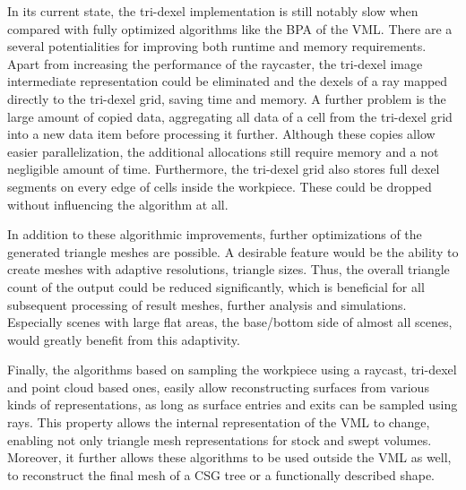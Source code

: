 In its current state, the tri-dexel implementation is still notably slow when compared with fully optimized algorithms like the BPA of the VML.
There are a several potentialities for improving both runtime and memory requirements.
Apart from increasing the performance of the raycaster, the tri-dexel image intermediate representation could be eliminated and the dexels of a ray mapped directly to the tri-dexel grid, saving time and memory.
A further problem is the large amount of copied data, \eg aggregating all data of a cell from the tri-dexel grid into a new data item before processing it further.
Although these copies allow easier parallelization, the additional allocations still require memory and a not negligible amount of time.
Furthermore, the tri-dexel grid also stores full dexel segments on every edge of cells inside the workpiece.
These could be dropped without influencing the algorithm at all.

In addition to these algorithmic improvements, further optimizations of the generated triangle meshes are possible.
A desirable feature would be the ability to create meshes with adaptive resolutions, \ie triangle sizes.
Thus, the overall triangle count of the output could be reduced significantly, which is beneficial for all subsequent processing of result meshes, \eg further analysis and simulations.
Especially scenes with large flat areas, \cf the base/bottom side of almost all scenes, would greatly benefit from this adaptivity.

Finally, the algorithms based on sampling the workpiece using a raycast, \ie tri-dexel and point cloud based ones, easily allow reconstructing surfaces from various kinds of representations, as long as surface entries and exits can be sampled using rays.
This property allows the internal representation of the VML to change, enabling not only triangle mesh representations for stock and swept volumes.
Moreover, it further allows these algorithms to be used outside the VML as well, \eg to reconstruct the final mesh of a CSG tree or a functionally described shape.
